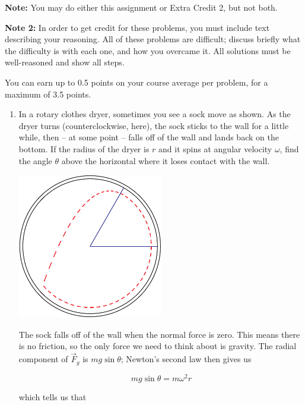 \documentclass[12pt]{article}
\begin{document}
\Large
\centerline{}
\normalsize
\centerline{}

{\bf Note:} You may do either this assignment or Extra Credit 2, but not both.

{\bf Note 2:} In order to get credit for these problems, you must include text describing your reasoning. All of these problems are difficult; discuss briefly what the difficulty is with each one, and 
how you overcame it. All solutions must be well-reasoned and show all steps.

You can earn up to 0.5 points on your course average per problem, for a maximum of 3.5 points.


\begin{enumerate}

\item In a rotary clothes dryer, sometimes you see a sock move as shown. As the dryer turns (counterclockwise, here), the sock sticks to the wall for a little while,
then -- at some point -- falls off of the wall and lands back on the bottom. If the radius of the dryer is $r$ and it spins at angular velocity $\omega$, find the angle
$\theta$ above the horizontal where it loses contact with the wall.

\begin{center}
\includegraphics[width=0.5\textwidth]{sock-crop.pdf}
\end{center}


\color{Red}

The sock falls off of the wall when the normal force is zero. This means there is no friction, so the only force
we need to think about is gravity. The radial component of $\vec F_g$ is $mg \sin \theta$; Newton's second
law then gives us 

$$mg \sin \theta = m\omega^2 r$$

which tells us that


\end{enumerate}
\end{document}
